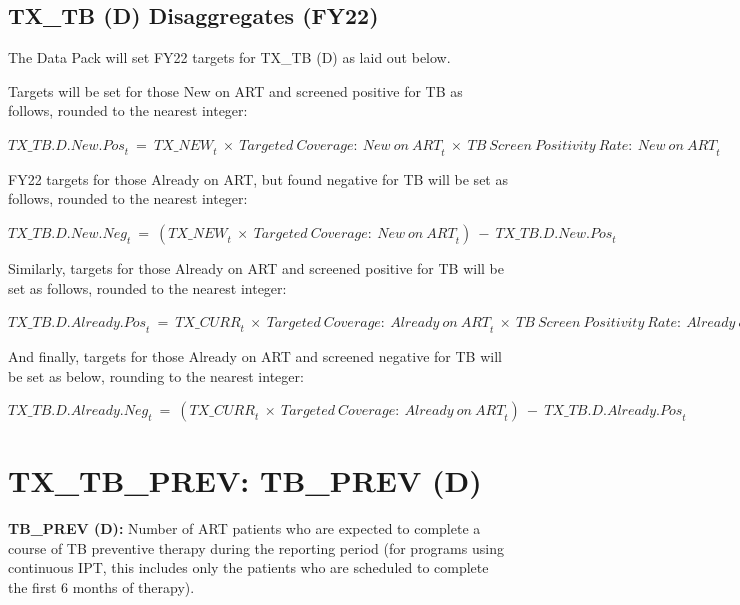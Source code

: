\documentclass[
  openany]{book}
\begin{document}
\hypertarget{tx_tb-d-disaggregates-fy22}{%
\subsection{TX\_TB (D) Disaggregates (FY22)}\label{tx_tb-d-disaggregates-fy22}}

The Data Pack will set FY22 targets for TX\_TB (D) as laid out below.

Targets will be set for those New on ART and screened positive for TB as
follows, rounded to the nearest integer:

\begin{center} ${TX\_ TB.D.New.Pos}_{t}\  = \ {TX\_ NEW}_{t}\  \times \ {Targeted\ Coverage:\ New\ on\ ART}_{t}\  \times \ {TB\ Screen\ Positivity\ Rate:\ New\ on\ ART}_{t}$ \end{center}

FY22 targets for those Already on ART, but found negative for TB will be
set as follows, rounded to the nearest integer:

\begin{center} ${TX\_ TB.D.New.Neg}_{t}\  = \ ({TX\_ NEW}_{t}\  \times \ {Targeted\ Coverage:\ New\ on\ ART}_{t})\  - \ {TX\_ TB.D.New.Pos}_{t}$ \end{center}

Similarly, targets for those Already on ART and screened positive for TB
will be set as follows, rounded to the nearest integer:

\begin{center} ${TX\_ TB.D.Already.Pos}_{t}\  = \ {TX\_ CURR}_{t}\  \times \ {Targeted\ Coverage:\ Already\ on\ ART}_{t}\  \times \ {TB\ Screen\ Positivity\ Rate:\ Already\ on\ ART}_{t}$ \end{center}

And finally, targets for those Already on ART and screened negative for
TB will be set as below, rounding to the nearest integer:

\begin{center} ${TX\_ TB.D.Already.Neg}_{t}\  = \ ({TX\_ CURR}_{t}\  \times \ {Targeted\ Coverage:\ Already\ on\ ART}_{t})\  - \ {TX\_ TB.D.Already.Pos}_{t}$ \end{center}

\hypertarget{tx_tb_prev-tb_prev-d}{%
\section{TX\_TB\_PREV: TB\_PREV (D)}\label{tx_tb_prev-tb_prev-d}}

\textbf{TB\_PREV (D):} Number of ART patients who are expected to complete a
course of TB preventive therapy during the reporting period (for
programs using continuous IPT, this includes only the patients who are
scheduled to complete the first 6 months of therapy).
\end{document}
